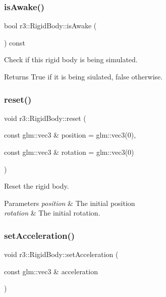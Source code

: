 \subsubsection{\texorpdfstring{is\+Awake()}{isAwake()}}
{\footnotesize\ttfamily bool r3\+::\+Rigid\+Body\+::is\+Awake (\begin{DoxyParamCaption}{ }\end{DoxyParamCaption}) const}



Check if this rigid body is being simulated. 

\begin{DoxyReturn}{Returns}
True if it is being siulated, false otherwise. 
\end{DoxyReturn}
\mbox{\label{classr3_1_1_rigid_body_a87ecb0826050e8dc9b9a9a8eaf0fff66}} 
\subsubsection{\texorpdfstring{reset()}{reset()}}
{\footnotesize\ttfamily void r3\+::\+Rigid\+Body\+::reset (\begin{DoxyParamCaption}\item[{const glm\+::vec3 \&}]{position = {\ttfamily glm\+:\+:vec3(0)},  }\item[{const glm\+::vec3 \&}]{rotation = {\ttfamily glm\+:\+:vec3(0)} }\end{DoxyParamCaption})}



Reset the rigid body. 


\begin{DoxyParams}{Parameters}
{\em position} & The initial position \\
\hline
{\em rotation} & The initial rotation. \\
\hline
\end{DoxyParams}
\mbox{\label{classr3_1_1_rigid_body_add57880a9a4df0d016c1639eba48350d}} 
\subsubsection{\texorpdfstring{set\+Acceleration()}{setAcceleration()}\hspace{0.1cm}{\footnotesize\ttfamily [1/2]}}
{\footnotesize\ttfamily void r3\+::\+Rigid\+Body\+::set\+Acceleration (\begin{DoxyParamCaption}\item[{const glm\+::vec3 \&}]{acceleration }\end{DoxyParamCaption})}



